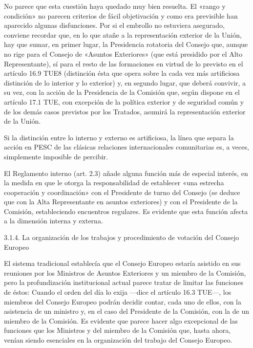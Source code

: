 \documentclass[10pt,a4paper]{article}
\begin{document}
No parece que esta cuestión haya quedado muy bien resuelta. El «rango y condición» no parecen criterios de fácil objetivación y como era previsible han aparecido algunas disfunciones. Por si el embrollo no estuviera asegurado, conviene recordar que, en lo que atañe a la representación exterior de la Unión, hay que sumar, en primer lugar, la Presidencia rotatoria del Consejo que, aunque no rige para el Consejo de «Asuntos Exteriores» (que está presidido por el Alto Representante), sí para el resto de las formaciones en virtud de lo previsto en el artículo 16.9 TUE8 (distinción ésta que opera sobre la cada vez más artificiosa distinción de lo interior y lo exterior) y, en segundo lugar, que deberá convivir, a su vez, con la acción de la Presidencia de la Comisión que, según dispone en el artículo 17.1 TUE, con excepción de la política exterior y de seguridad común y de los demás casos previstos por los Tratados, asumirá la representación exterior de la Unión. 

Si la distinción entre lo interno y externo es artificiosa, la línea que separa la acción en PESC de las clásicas relaciones internacionales comunitarias es, a veces, simplemente imposible de percibir.

El Reglamento interno (art. 2.3) añade alguna función más de especial interés, en la medida en que le otorga la responsabilidad de establecer «una estrecha cooperación y coordinación» con el Presidente de turno del Consejo (se deduce que con la Alta Representante en asuntos exteriores) y con el Presidente de la Comisión, estableciendo encuentros regulares. Es evidente que esta función afecta a la dimensión interna y externa.

3.1.4. La organización de los trabajos y procedimiento de votación
del Consejo Europeo

El sistema tradicional establecía que el Consejo Europeo estaría asistido en sus reuniones por los Ministros de Asuntos Exteriores y un miembro de la Comisión, pero la profundización institucional actual parece tratar de limitar las funciones de éstos: Cuando el orden del día lo exija —dice el artículo 16.3 TUE—, los miembros del Consejo Europeo podrán decidir contar, cada uno de ellos, con la asistencia de un ministro y, en el caso del Presidente de la Comisión, con la de un miembro de la Comisión. Es evidente que parece hacer algo excepcional de las funciones que los Ministros y del miembro de la Comisión que, hasta ahora, venían siendo esenciales en la organización del trabajo del Consejo Europeo.
\end{document}
